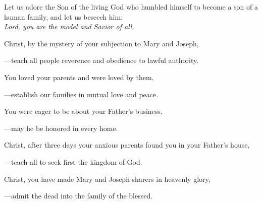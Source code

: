 \intercessions\indent

\begin{hangpar}

Let us adore the Son of the living God who humbled himself to become a son of a human family, and let us beseech him:\\
\emph{Lord, you are the model and Savior of all.}

\medskip Christ, by the mystery of your subjection to Mary and Joseph,

{\color{red}---\thinspace}teach all people reverence and obedience to lawful authority.

\medskip You loved your parents and were loved by them,

{\color{red}---\thinspace}establish our families in mutual love and peace.

\medskip You were eager to be about your Father’s business,

{\color{red}---\thinspace}may he be honored in every home.

\medskip Christ, after three days your anxious parents found you in your Father’s house,

{\color{red}---\thinspace}teach all to seek first the kingdom of God.

\medskip Christ, you have made Mary and Joseph sharers in heavenly glory,

{\color{red}---\thinspace}admit the dead into the family of the blessed.

\medskip

\end{hangpar}